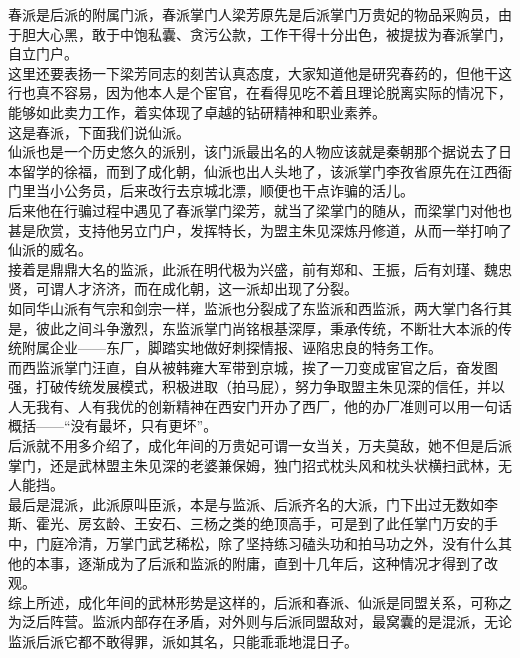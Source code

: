 \begin{multicols}{\theparacolNo}
春派是后派的附属门派，春派掌门人梁芳原先是后派掌门万贵妃的物品采购员，由于胆大心黑，敢于中饱私囊、贪污公款，工作干得十分出色，被提拔为春派掌门，自立门户。\\

这里还要表扬一下梁芳同志的刻苦认真态度，大家知道他是研究春药的，但他干这行也真不容易，因为他本人是个宦官，在看得见吃不着且理论脱离实际的情况下，能够如此卖力工作，着实体现了卓越的钻研精神和职业素养。\\

这是春派，下面我们说仙派。\\

仙派也是一个历史悠久的派别，该门派最出名的人物应该就是秦朝那个据说去了日本留学的徐福，而到了成化朝，仙派也出人头地了，该派掌门李孜省原先在江西衙门里当小公务员，后来改行去京城北漂，顺便也干点诈骗的活儿。\\

后来他在行骗过程中遇见了春派掌门梁芳，就当了梁掌门的随从，而梁掌门对他也甚是欣赏，支持他另立门户，发挥特长，为盟主朱见深炼丹修道，从而一举打响了仙派的威名。\\

接着是鼎鼎大名的监派，此派在明代极为兴盛，前有郑和、王振，后有刘瑾、魏忠贤，可谓人才济济，而在成化朝，这一派却出现了分裂。\\

如同华山派有气宗和剑宗一样，监派也分裂成了东监派和西监派，两大掌门各行其是，彼此之间斗争激烈，东监派掌门尚铭根基深厚，秉承传统，不断壮大本派的传统附属企业——东厂，脚踏实地做好刺探情报、诬陷忠良的特务工作。\\

而西监派掌门汪直，自从被韩雍大军带到京城，挨了一刀变成宦官之后，奋发图强，打破传统发展模式，积极进取（拍马屁），努力争取盟主朱见深的信任，并以人无我有、人有我优的创新精神在西安门开办了西厂，他的办厂准则可以用一句话概括——“没有最坏，只有更坏”。\\

后派就不用多介绍了，成化年间的万贵妃可谓一女当关，万夫莫敌，她不但是后派掌门，还是武林盟主朱见深的老婆兼保姆，独门招式枕头风和枕头状横扫武林，无人能挡。\\

最后是混派，此派原叫臣派，本是与监派、后派齐名的大派，门下出过无数如李斯、霍光、房玄龄、王安石、三杨之类的绝顶高手，可是到了此任掌门万安的手中，门庭冷清，万掌门武艺稀松，除了坚持练习磕头功和拍马功之外，没有什么其他的本事，逐渐成为了后派和监派的附庸，直到十几年后，这种情况才得到了改观。\\

综上所述，成化年间的武林形势是这样的，后派和春派、仙派是同盟关系，可称之为泛后阵营。监派内部存在矛盾，对外则与后派同盟敌对，最窝囊的是混派，无论监派后派它都不敢得罪，派如其名，只能乖乖地混日子。\\


\end{multicols}
